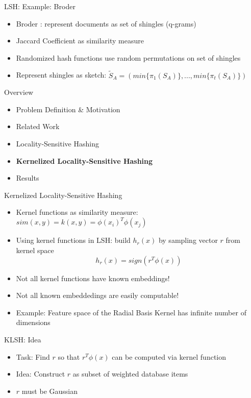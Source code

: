 \documentclass[12pt,a4paper]{beamer}
\begin{document}
\begin{frame}{LSH: Example: Broder}
\begin{itemize}
\item Broder \cite{broder}: represent documents as set of shingles (q-grams)
\item Jaccard Coefficient as similarity measure
\item Randomized hash functions use random permutations on set of shingles
\item Represent shingles as sketch: $\tilde S_{A} = (min\{\pi_{1}(S_{A})\},..., min\{\pi_{t}(S_{A})\})$
\end{itemize}
\end{frame}

\begin{frame}{Overview}
\begin{itemize}
\item Problem Definition \& Motivation
\item Related Work
\item Locality-Sensitive Hashing
\item \textbf{Kernelized Locality-Sensitive Hashing}
\item Results
\end{itemize}
\end{frame}

\begin{frame}{Kernelized Locality-Sensitive Hashing}
\begin{itemize}
\item Kernel functions as similarity measure: $sim(x,y) = k(x,y) = \phi(x_{i})^{T}\phi(x_{j}) $ \cite{klsh}
\item Using kernel functions in LSH: build $h_r(x)$ by sampling vector $r$ from kernel space
$$h_r(x)=sign(r^T\phi(x))$$
\item Not all kernel functions have known embeddings! \cite{klsh}
\item Not all known embeddedings are easily computable!
\item Example: Feature space of the Radial Basis Kernel has infinite number of dimensions
\end{itemize}
\end{frame}

\begin{frame}{KLSH: Idea}
\begin{itemize}
\item Task: Find $r$ so that $r^T\phi (x)$ can be computed via kernel function
\item Idea: Construct $r$ as subset of weighted database items
\item $r$ must be Gaussian \cite{lsh}
\end{itemize}
\end{frame}
\end{document}
